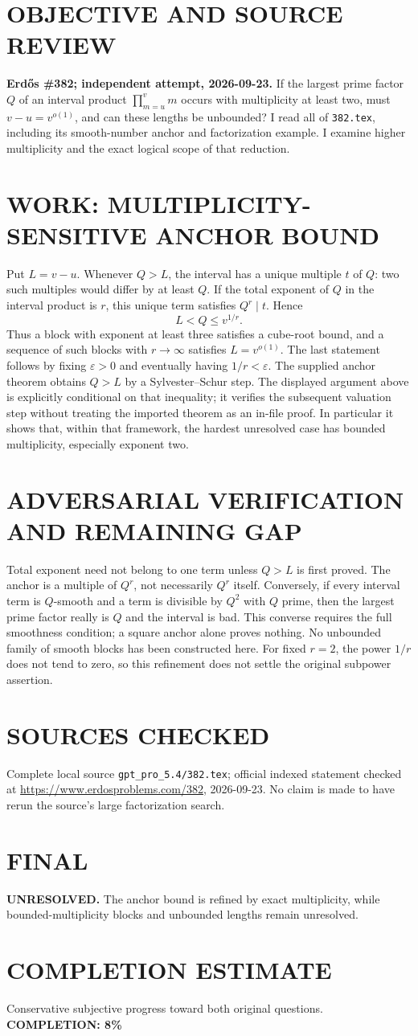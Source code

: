 \section{OBJECTIVE AND SOURCE REVIEW}
\textbf{Erd\H{o}s \#382; independent attempt, 2026-09-23.}
If the largest prime factor $Q$ of an interval product $\prod_{m=u}^v m$ occurs with multiplicity at least two, must $v-u=v^{o(1)}$, and can these lengths be unbounded? I read all of \texttt{382.tex}, including its smooth-number anchor and factorization example. I examine higher multiplicity and the exact logical scope of that reduction.
\section{WORK: MULTIPLICITY-SENSITIVE ANCHOR BOUND}
Put $L=v-u$. Whenever $Q>L$, the interval has a unique multiple $t$ of $Q$: two such multiples would differ by at least $Q$. If the total exponent of $Q$ in the interval product is $r$, this unique term satisfies $Q^r\mid t$. Hence
\[
L<Q\le v^{1/r}.
\]
Thus a block with exponent at least three satisfies a cube-root bound, and a sequence of such blocks with $r\to\infty$ satisfies $L=v^{o(1)}$. The last statement follows by fixing $\varepsilon>0$ and eventually having $1/r<\varepsilon$.
The supplied anchor theorem obtains $Q>L$ by a Sylvester--Schur step. The displayed argument above is explicitly conditional on that inequality; it verifies the subsequent valuation step without treating the imported theorem as an in-file proof. In particular it shows that, within that framework, the hardest unresolved case has bounded multiplicity, especially exponent two.
\section{ADVERSARIAL VERIFICATION AND REMAINING GAP}
Total exponent need not belong to one term unless $Q>L$ is first proved. The anchor is a multiple of $Q^r$, not necessarily $Q^r$ itself. Conversely, if every interval term is $Q$-smooth and a term is divisible by $Q^2$ with $Q$ prime, then the largest prime factor really is $Q$ and the interval is bad. This converse requires the full smoothness condition; a square anchor alone proves nothing. No unbounded family of smooth blocks has been constructed here. For fixed $r=2$, the power $1/r$ does not tend to zero, so this refinement does not settle the original subpower assertion.
\section{SOURCES CHECKED}
Complete local source \texttt{gpt\_pro\_5.4/382.tex}; official indexed statement checked at \url{https://www.erdosproblems.com/382}, 2026-09-23. No claim is made to have rerun the source's large factorization search.
\section{FINAL}
\textbf{UNRESOLVED.} The anchor bound is refined by exact multiplicity, while bounded-multiplicity blocks and unbounded lengths remain unresolved.
\section{COMPLETION ESTIMATE}
Conservative subjective progress toward both original questions.
\textbf{COMPLETION: 8\%}
